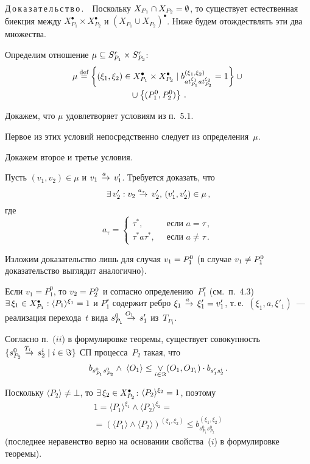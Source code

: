 \begin{multicols}{2}
\noindent
Д\,о\,к\,а\,з\,а\,т\,е\,л\,ь\,с\,т\,в\,о\,.\ \
Поскольку $X_{P_1}\cap X_{P_2}\hm=\emptyset$,
то существует естественная биекция между
$X_{P_1}^\bullet \times X_{P_2}^\bullet$
и $(X_{P_1}\cup X_{P_2})^\bullet$.
Ниже будем отождествлять эти два множества.

Определим  отношение $\mu\hm\subseteq S_{P_1}^r \hm\times S_{P_2}^r$:
\begin{multline*}
\mu\mathbin{{\mathop{=}\limits^{\mathrm{def}}}} \left\{(\xi_1, \xi_2) \in X_{P_1}^\bullet \times X_{P_2}^\bullet
\mid b_{at_{P_1}^{\xi_1}at_{P_2}^{\xi_2}}^{(\xi_1,\xi_2)}=1
\right\}\cup{}\\
{}\cup\left\{(P_1^0, P_2^0)\right\}\,.
\end{multline*}

Докажем, что $\mu$ удовлетворяет условиям из п.~5.1.

Первое из этих условий непосредственно следует из определения~$\mu$.

Докажем второе и третье условия.

Пусть $(v_1, v_2)\in \mu$ и $v_1\;\mathop{\to}\limits^{\!\!\!a}\;v'_1$.
Требуется доказать, что
\begin{equation}
\label{fdgd4444}
\exists\,v'_2: v_2\;\mathop{\to}\limits^{\!\!\!a_\tau}\;v'_2,\,
(v'_1, v'_2)\in \mu\,,
\end{equation}
где
$$
a_\tau=
\begin{cases}
\tau^*,&\ \mbox{ если } a=\tau\,,\\
\tau^*a\tau^*,&\ \mbox{ если } a\neq\tau\,.
\end{cases}
$$

Изложим доказательство лишь для случая
$v_1\hm=P^0_1$ (в случае $v_1\hm\neq P^0_1$ доказательство выглядит аналогично).

Если $v_1=P^0_1$, то $v_2\hm=P^0_2$ и согласно определению~$P_1^r$
(см.\ п.~4.3) $\exists\,\xi_1\hm\in X_{P_1}^\bullet:
\langle{P_1}\rangle^{\xi_1}\hm=1$ и $P_1^r$ содержит ребро
$\xi_1\ra{a}\xi'_1\hm=v'_1$, т.\,е.\ $(\xi_1, a, \xi'_1)$~--- реализация
перехода~$t$ вида $s_{P_1}^0\;\mathop{\to}\limits^{\!\!\!O_1}\;s'_1$ из~$T_{P_1}$.

Согласно п.~($ii$) в формулировке теоремы, существует совокупность
$\{s_{P_2}^0\ra{T_i}s_2^i\mid i\hm\in\Im\}$
   СП процесса~$P_2$ такая, что
\begin{equation}
\label{fdgdsfgfdsgr4r}
b_{s_{P_1}^0s_{P_2}^0} \wedge \; \langle{O_1}\rangle
\leq \mathop{\vee}\limits_{i\in\Im} (O_1, O_{T_i}) \cdot b_{s'_1s^{i}_2}\,.
\end{equation}

Поскольку $\langle{P_2}\rangle\neq \bot$, то $\exists\,\xi_2\hm\in X_{P_2}^\bullet$:
$\langle{P_2}\rangle^{\xi_2} \hm= 1$, поэтому
\begin{multline}
\label{fdgdsfgfdsgr4r1}
1=\langle{P_1}\rangle^{\xi_1} \wedge\langle{P_2}\rangle^{\xi_2}={}\\
{}=
(\langle{P_1}\rangle\wedge \langle{P_2}\rangle)^{(\xi_1,\xi_2)}\leq
b_{s^0_{P_1}s^0_{P_2}}^{(\xi_1,\xi_2)}
\end{multline}
(последнее неравенство верно на основании свойства~($i$) в формулировке теоремы).


\end{multicols}
